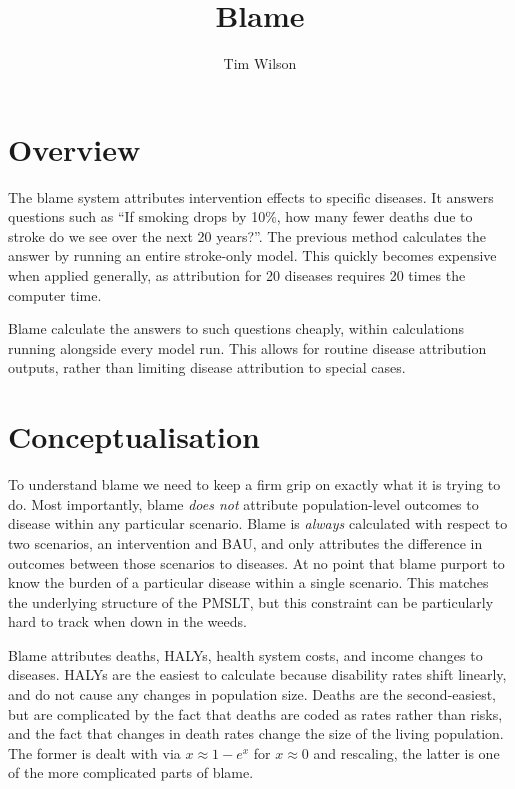 \documentclass[]{article}
\title{Blame}
\author{Tim Wilson}
\begin{document}
	
\maketitle

\section{Overview}

The blame system attributes intervention effects to specific diseases. It answers questions such as ``If smoking drops by 10\%, how many fewer deaths due to stroke do we see over the next 20 years?''. The previous method calculates the answer by running an entire stroke-only model. This quickly becomes expensive when applied generally, as attribution for 20 diseases requires 20 times the computer time. 

Blame calculate the answers to such questions cheaply, within calculations running alongside every model run. This allows for routine disease attribution outputs, rather than limiting disease attribution to special cases.

\section{Conceptualisation}

To understand blame we need to keep a firm grip on exactly what it is trying to do. Most importantly, blame \textit{does not} attribute population-level outcomes to disease within any particular scenario. Blame is \textit{always} calculated with respect to two scenarios, an intervention and BAU, and only attributes the difference in outcomes between those scenarios to diseases. At no point that blame purport to know the burden of a particular disease within a single scenario. This matches the underlying structure of the PMSLT, but this constraint can be particularly hard to track when down in the weeds.

Blame attributes deaths, HALYs, health system costs, and income changes to diseases. HALYs are the easiest to calculate because disability rates shift linearly, and do not cause any changes in population size. Deaths are the second-easiest, but are complicated by the fact that deaths are coded as rates rather than risks, and the fact that changes in death rates change the size of the living population. The former is dealt with via $x \approx 1 - e^x$ for $x \approx 0$ and rescaling, the latter is one of the more complicated parts of blame.
\end{document}

